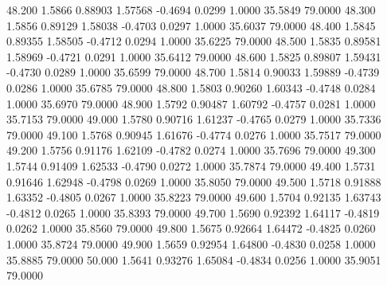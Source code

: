   48.200   1.5866   0.88903   1.57568  -0.4694   0.0299   1.0000  35.5849  79.0000
  48.300   1.5856   0.89129   1.58038  -0.4703   0.0297   1.0000  35.6037  79.0000
  48.400   1.5845   0.89355   1.58505  -0.4712   0.0294   1.0000  35.6225  79.0000
  48.500   1.5835   0.89581   1.58969  -0.4721   0.0291   1.0000  35.6412  79.0000
  48.600   1.5825   0.89807   1.59431  -0.4730   0.0289   1.0000  35.6599  79.0000
  48.700   1.5814   0.90033   1.59889  -0.4739   0.0286   1.0000  35.6785  79.0000
  48.800   1.5803   0.90260   1.60343  -0.4748   0.0284   1.0000  35.6970  79.0000
  48.900   1.5792   0.90487   1.60792  -0.4757   0.0281   1.0000  35.7153  79.0000
  49.000   1.5780   0.90716   1.61237  -0.4765   0.0279   1.0000  35.7336  79.0000
  49.100   1.5768   0.90945   1.61676  -0.4774   0.0276   1.0000  35.7517  79.0000
  49.200   1.5756   0.91176   1.62109  -0.4782   0.0274   1.0000  35.7696  79.0000
  49.300   1.5744   0.91409   1.62533  -0.4790   0.0272   1.0000  35.7874  79.0000
  49.400   1.5731   0.91646   1.62948  -0.4798   0.0269   1.0000  35.8050  79.0000
  49.500   1.5718   0.91888   1.63352  -0.4805   0.0267   1.0000  35.8223  79.0000
  49.600   1.5704   0.92135   1.63743  -0.4812   0.0265   1.0000  35.8393  79.0000
  49.700   1.5690   0.92392   1.64117  -0.4819   0.0262   1.0000  35.8560  79.0000
  49.800   1.5675   0.92664   1.64472  -0.4825   0.0260   1.0000  35.8724  79.0000
  49.900   1.5659   0.92954   1.64800  -0.4830   0.0258   1.0000  35.8885  79.0000
  50.000   1.5641   0.93276   1.65084  -0.4834   0.0256   1.0000  35.9051  79.0000
